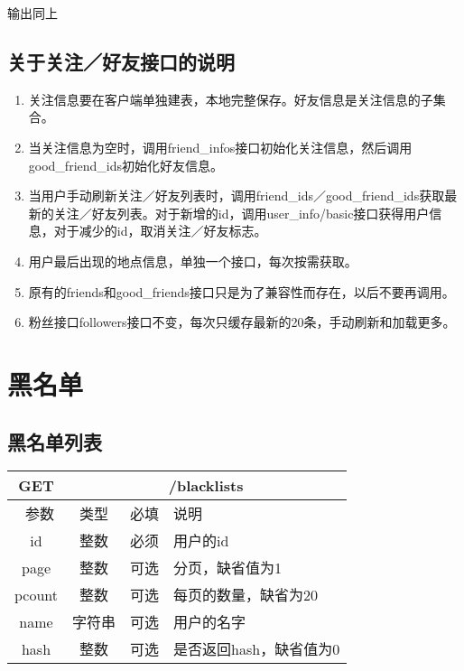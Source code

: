 输出同上


\subsection{关于关注／好友接口的说明}
\begin{enumerate}
\item 关注信息要在客户端单独建表，本地完整保存。好友信息是关注信息的子集合。
\item 当关注信息为空时，调用friend\_infos接口初始化关注信息，然后调用good\_friend\_ids初始化好友信息。
\item 当用户手动刷新关注／好友列表时，调用friend\_ids／good\_friend\_ids获取最新的关注／好友列表。对于新增的id，调用user\_info/basic接口获得用户信息，对于减少的id，取消关注／好友标志。
\item 用户最后出现的地点信息，单独一个接口，每次按需获取。
\item 原有的friends和good\_friends接口只是为了兼容性而存在，以后不要再调用。
\item 粉丝接口followers接口不变，每次只缓存最新的20条，手动刷新和加载更多。
\end{enumerate}



\section{黑名单}
\subsection{黑名单列表}

\begin{table}[H]
   \begin{center}
\begin{tabular}{|c|c|c|p{12cm}|}
\hline
GET & \multicolumn{3}{|c|}{/blacklists} \\
\hline\hline
 \  参数  & 类型 & 必填 &  说明  \\
\hline
 id  & 整数 & 必须 &  用户的id\\
   \hline
 page  & 整数 & 可选 & 分页，缺省值为1\\ 
 \hline
 pcount  & 整数 & 可选 & 每页的数量，缺省为20\\ 
     \hline
 name  & 字符串 & 可选 & 用户的名字\\ 
     \hline
 hash  & 整数 & 可选 & 是否返回hash，缺省值为0\\ 
\hline
\end{tabular}
   \end{center}
\end{table}

